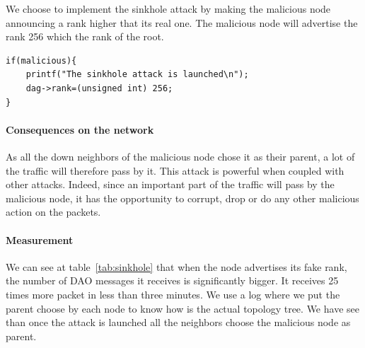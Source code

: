 \documentclass[11pt]{report}
\begin{document}
We choose to implement the sinkhole attack by making the malicious node
announcing a rank higher that its real one. The malicious node will
advertise the rank 256 which the rank of the root.

\begin{lstlisting}[caption={Sinkhole attack done in the rpl-icmp6.c in the method dio output}]
if(malicious){
	printf("The sinkhole attack is launched\n");
	dag->rank=(unsigned int) 256;
}
\end{lstlisting}

\paragraph{Consequences on the network}

As all the down neighbors of the malicious node chose it as their
parent, a lot of the traffic will therefore pass by it. This attack is
powerful when coupled with other attacks. Indeed, since an important
part of the traffic will pass by the malicious node, it has the
opportunity to corrupt, drop or do any other malicious action on the
packets.


\paragraph{Measurement}

We can see at table~\ref{tab:sinkhole} that when the node advertises its fake rank, the number of
DAO messages it receives is significantly bigger. It receives 25 times
more packet in less than three minutes. We use a log where we put the
parent choose by each node to know how is the actual topology tree. We
have see than once the attack is launched all the neighbors choose the
malicious node as parent. 



\begin{table}
	\centering
    \caption{Impact of  sinkhole on DAO MSG}
    \label{tab:sinkhole}
\end{table}
\end{document}
